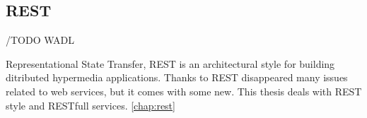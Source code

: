 \subsection{REST}
/TODO WADL

Representational State Transfer, REST is an architectural style for building ditributed hypermedia applications.
Thanks to REST disappeared many issues related to web services, but it comes with some new. This thesis deals with REST style and RESTfull services. \ref{chap:rest}

    

